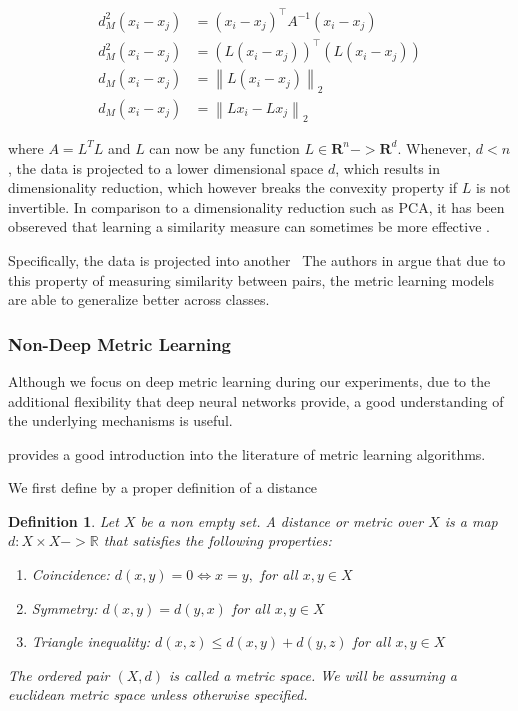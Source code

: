 \documentclass[a4paper,12pt,oneside,openright]{report}
\begin{document}
\begin{align}
d_{M}^{2}\left(x_{i}-x_{j}\right) &=\left(x_{i}-x_{j}\right)^{\top} A^{-1}\left(x_{i}-x_{j}\right) \\
d_{M}^{2}\left(x_{i}-x_{j}\right) &= (L\left(x_{i}-x_{j}\right))^{\top} (L\left(x_{i}-x_{j}\right)) \\
d_{M}\left(x_{i}-x_{j}\right) &=\left\|L\left(x_{i}-x_{j}\right)\right\|_{2} \\
d_{M}\left(x_{i}-x_{j}\right) &=\left\|Lx_{i}-Lx_{j}\right\|_{2}
\end{align}

where $A = L^T L$ and $L$ can now be any function $L \in \mathbf{R}^n -> \mathbf{R}^d$. 
Whenever, $d < n$, the data is projected to a lower dimensional space $d$, which results in dimensionality reduction, which however breaks the convexity property if $L$ is not invertible.
In comparison to a dimensionality reduction such as PCA, it has been obsereved that learning a similarity measure can sometimes be more effective \cite{chechik10}.

Specifically, the data is projected into another  \
The authors in \cite{moutafis17} argue that due to this property of measuring similarity between pairs, the metric learning models are able to generalize better across classes.

\subsubsection{Non-Deep Metric Learning}

Although we focus on deep metric learning during our experiments, due to the additional flexibility that deep neural networks provide, a good understanding of the underlying mechanisms is useful.

\cite{suarez19} provides a good introduction into the literature of metric learning algorithms.

We first define by a proper definition of a distance

\newtheorem{mydef}{Definition}
\begin{mydef}
Let $X$ be a non empty set. A \textit{distance} or \textit{metric} over $X$ is a map $d: X \times X -> \mathbb{R}$ that satisfies the following properties:

\begin{enumerate}
\item Coincidence: $d(x, y) = 0 \iff x = y,$ for all $x, y \in X$
\item Symmetry: $d(x, y) = d(y, x)$ for all $x, y \in X$
\item Triangle inequality: $d(x, z) \leq d(x, y) + d(y, z) $ for all $x, y \in X$
\end{enumerate}
The ordered pair $(X, d)$ is called a metric space. 
We will be assuming a euclidean metric space unless otherwise specified.
\end{mydef}
\end{document}
